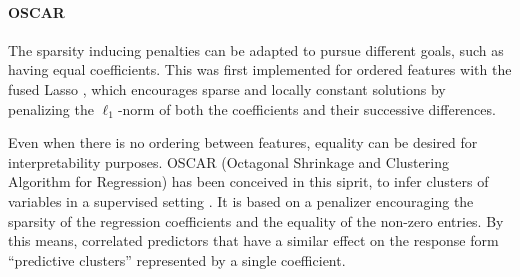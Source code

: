 \paragraph{OSCAR}

The sparsity inducing penalties can be adapted to pursue different goals, such
as having equal coefficients.  This was first implemented for ordered features
with the fused Lasso \citep{Tibshirani05}, which encourages sparse and locally
constant solutions by penalizing the $\ell_1$-norm of both the coefficients and
their successive differences.

Even when there is no ordering between features, equality can be desired for
interpretability purposes.  OSCAR (Octagonal Shrinkage and Clustering Algorithm
for Regression) has been conceived in this siprit, to infer clusters of
variables in a supervised setting \citep{Bondell08}.
It is based on a penalizer encouraging the sparsity of the regression
coefficients and the equality of the non-zero entries.
By this means, correlated predictors that have a similar effect on the response
form ``predictive clusters'' represented by a single coefficient.


